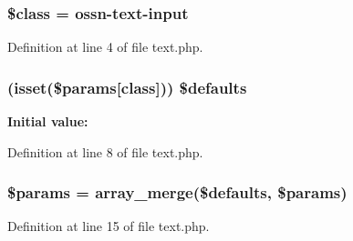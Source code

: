 \subsubsection[{\texorpdfstring{\$class}{$class}}]{\setlength{\rightskip}{0pt plus 5cm}\$class = \textquotesingle{}ossn-\/text-\/{\bf input}\textquotesingle{}}\hypertarget{text_8php_a252ba022809910ea710a068fc1bab657}{}\label{text_8php_a252ba022809910ea710a068fc1bab657}


Definition at line 4 of file text.\+php.

\subsubsection[{\texorpdfstring{\$defaults}{$defaults}}]{ (isset(\$params\mbox{[}\textquotesingle{}class\textquotesingle{}\mbox{]})) \${\bf defaults}}\hypertarget{text_8php_a869093199c1f15238a97c4cf3af15f8d}{}\label{text_8php_a869093199c1f15238a97c4cf3af15f8d}
{\bfseries Initial value\+:}


Definition at line 8 of file text.\+php.

\subsubsection[{\texorpdfstring{\$params}{$params}}]{\setlength{\rightskip}{0pt plus 5cm}\$params = array\+\_\+merge(\${\bf defaults}, \$params)}\hypertarget{text_8php_afe68e6fbe7acfbffc0af0c84a1996466}{}\label{text_8php_afe68e6fbe7acfbffc0af0c84a1996466}


Definition at line 15 of file text.\+php.

